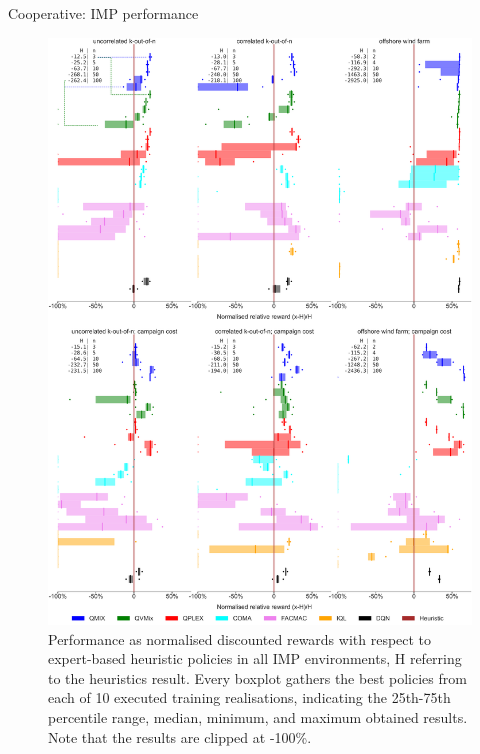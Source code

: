 \documentclass[9pt, hyperref={pdfusetitle,colorlinks=true,allcolors=DarkBlue}]{beamer}
\begin{document}
\begin{frame}{Cooperative: IMP performance}
\captionsetup{font=scriptsize}
    \begin{figure}
    \centering
    \includegraphics[width=.9\textwidth]{boxplot_perc_limit_up.pdf}
\caption{Performance as normalised discounted rewards with respect to expert-based heuristic policies in all IMP environments, H referring to the heuristics result.
Every boxplot gathers the best policies from each of 10 executed training realisations, indicating the 25th-75th percentile range, median, minimum, and maximum obtained results.
Note that the results are clipped at -100\%.
}
\label{fig:imp_results}
\end{figure}

\end{frame}
\end{document}

